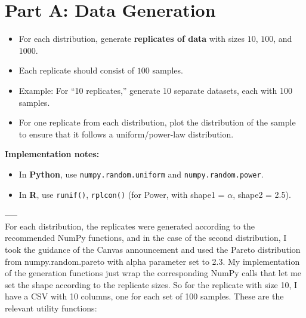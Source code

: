 \section{Part A: Data Generation}
\begin{itemize}
    \item For each distribution, generate \textbf{replicates of data} with sizes $10$, $100$, and $1000$.  
    \item Each replicate should consist of $100$ samples.  
    \item Example: For ``10 replicates,'' generate 10 separate datasets, each with 100 samples.  
    \item For one replicate from each distribution, plot the distribution of the sample to ensure that it follows a uniform/power-law distribution.
\end{itemize}

\textbf{Implementation notes:}  
\begin{itemize}
    \item In \textbf{Python}, use \texttt{numpy.random.uniform} and \texttt{numpy.random.power}.%
    \item In \textbf{R}, use \texttt{runif()}, \texttt{rplcon()} (for Power, with shape1 = $\alpha$, shape2 = 2.5).
        
\end{itemize}
-----\\

For each distribution, the replicates were generated according to the recommended NumPy functions, and in the case of the second distribution, I took the guidance of the Canvas announcement and used the Pareto distribution from numpy.random.pareto with alpha parameter set to 2.3. My implementation of the generation functions just wrap the corresponding NumPy calls that let me set the shape according to the replicate sizes. So for the replicate with size 10, I have a CSV with 10 columns, one for each set of 100 samples. These are the relevant utility functions:


